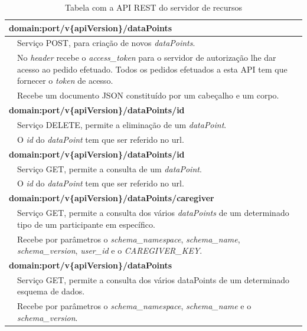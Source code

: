 \begin{table}[H]
\centering
\begin{tabularx}{1\textwidth}{|p{0.3cm} p{14.4cm}|}
\multicolumn{2}{l}{\textbf{domain:port/v\{apiVersion\}/dataPoints}}  \\ \hline 
 & Serviço POST, para criação de novos  \textit{dataPoints}. \\
 & No  \textit{header} recebe o  \textit{access\_token} para o servidor de autorização lhe dar acesso ao pedido efetuado. Todos os pedidos efetuados a esta \gls{API} tem que fornecer o \textit{token} de acesso.  \\
 & Recebe um documento JSON constituído por um cabeçalho e um corpo. \\ \hline
 
 
\multicolumn{2}{l}{\textbf{domain:port/v\{apiVersion\}/dataPoints/id}} \\ \hline
 & Serviço DELETE, permite a eliminação de um  \textit{dataPoint}. \\
 & O  \textit{id} do  \textit{dataPoint} tem que ser referido no url. \\ \hline
 
 
 \multicolumn{2}{l}{\textbf{domain:port/v\{apiVersion\}/dataPoints/id}} \\ \hline
 & Serviço GET, permite a consulta de um  \textit{dataPoint}. \\
 & O  \textit{id} do  \textit{dataPoint} tem que ser referido no url. \\ \hline
 
 
 \multicolumn{2}{l}{\textbf{domain:port/v\{apiVersion\}/dataPoints/caregiver}} \\ \hline
 & Serviço GET, permite a consulta dos vários  \textit{dataPoints} de um determinado tipo de um participante em específico. \\
 & Recebe por parâmetros o  \textit{schema\_namespace},  \textit{schema\_name},  \textit{schema\_version},  \textit{user\_id} e o  \textit{CAREGIVER\_KEY}. \\ \hline
 
 
 \multicolumn{2}{l}{\textbf{domain:port/v\{apiVersion\}/dataPoints}} \\ \hline
 & Serviço GET, permite a consulta dos vários dataPoints de um determinado esquema de dados. \\
 & Recebe por parâmetros o  \textit{schema\_namespace},  \textit{schema\_name} e o  \textit{schema\_version}. \\ \hline
\end{tabularx}

\caption{Tabela com a API REST do servidor de recursos}
\label{t:apirest-data}
\end{table}


